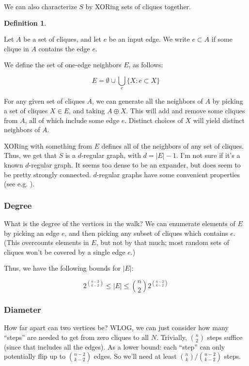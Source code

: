 \documentclass[12pt]{article}
\theoremstyle{definition}
\newtheorem{defn}{Definition}[section]
\begin{document}
We can also characterize $S$ by XORing sets of cliques together.

\begin{defn} \label{def:oneEdgeNeighbors}

Let $A$ be a set of cliques, and let $e$ be an input edge. We write
$e \subset A$ if some clique in $A$ contains the edge $e$.

We define the set of one-edge neighbors $E$, as follows:

\[
E = \emptyset \cup \bigcup_e \{ X: e \subset X\}
\]

\end{defn}

For any given set of cliques $A$, we can generate all the neighbors
of $A$ by picking a set of cliques $X \in E$, and taking $A \oplus X$. This will
add and remove some cliques from $A$, all of which include some edge $e$.
Distinct choices of $X$ will yield distinct neighbors of $A$.

XORing with something from $E$ defines all of the neighbors of any set of cliques.
Thus, we get that $S$ is a $d$-regular graph, with $d = |E|-1$.
I'm not sure if it's a known $d$-regular graph.
It seems too
dense to be an expander, but does seem to be pretty strongly connected.
$d$-regular graphs have some convenient properties (see e.g.
\cite{quenell1994spectral}).

\subsubsection{Degree}

What is the degree of the vertices in the walk?
We can enumerate elements of $E$ by picking an edge $e$, 
and then picking any subset of cliques which contains $e$. (This overcounts
elements in $E$, but not by that much; most random sets of cliques won't be
covered by a single edge $e$.)

Thus, we have the following bounds for $|E|$:

\[
2^{{n-2} \choose {k-2}} \le |E| \le {n \choose 2} 2^{{n-2} \choose {k-2}}
\]

\subsubsection{Diameter}

How far apart can two vertices be? WLOG, we can just consider how many ``steps''
are needed to get from zero cliques to all $N$. Trivially, ${n \choose 2}$ steps
suffice (since that includes all the edges).
As a lower bound: each ``step'' can only potentially flip up to
${n-2 \choose k-2}$ edges. So we'll need at least ${n \choose k} / {n-2 \choose k-2}$
steps.
\end{document}
